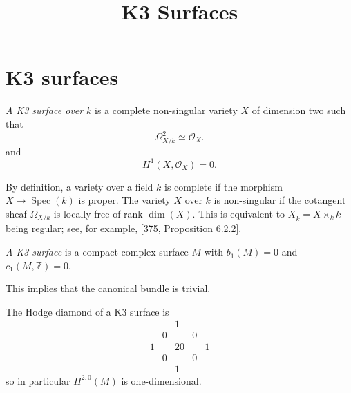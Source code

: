 



\title{K3 Surfaces}
\maketitle

\label{section-phantom}
\tableofcontents

\section{K3 surfaces}
\label{section-k3-surfaces}

\begin{reference}
\cite[Definition 1.1]{huc-k3}
\end{reference}

\begin{definition}[Huybrechts]
\label{definition-k3-huybrechts}
\textit{A K3 surface over $k$} is a complete
non-singular variety $X$ of dimension two
such that
$$
\Omega^2_{X/k}\simeq\mathcal{O}_X.
$$
and
$$
H^1(X,\mathcal{O}_X)=0.
$$
\end{definition}

\noindent
By definition, a variety over a field $k$ is
complete if the morphism
$X\to\operatorname{Spec}(k)$ is proper.
The variety $X$ over $k$ is non-singular if
the cotangent sheaf $\Omega_{X/k}$ is locally
free of rank $\dim(X)$. This is equivalent
to
$X_{\overline{k}}=X\times_k\overline{k}$
being regular; see, for example, [375,
Proposition 6.2.2].

\begin{definition}[Misha]
\label{definition-k3-misha}
\textit{A K3 surface} is a compact complex
surface $M$
with
$b_1(M)=0$ and
$c_1(M,\mathbb{Z})=0$.
\end{definition}

\begin{remark}
This implies that the canonical
bundle is trivial.
\end{remark}

\begin{proposition}
The Hodge diamond of a K3 surface
is
\[
\begin{matrix}
&&1&&\\
&0&&0&\\
1&&20&&1\\
&0&&0&\\
&&1&&
\end{matrix}
\]
so in particular
$H^{2,0}(M)$ is one-dimensional.
\end{proposition}

